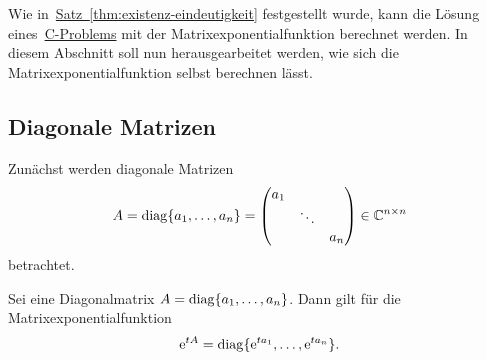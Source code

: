 Wie in~\hyperref[thm:existenz-eindeutigkeit]{Satz~\ref*{thm:existenz-eindeutigkeit}} festgestellt wurde,
kann die Lösung eines~\hyperref[eq:cp]{C-Problems} mit der Matrixexponentialfunktion berechnet werden.
In diesem Abschnitt soll nun herausgearbeitet werden, wie sich die Matrixexponentialfunktion selbst berechnen lässt.

\subsection{Diagonale Matrizen}\label{subsec:diagonale-matrizen}
Zunächst werden diagonale Matrizen
\begin{equation*}
    A = \operatorname{diag}\{a_1,\dots,a_n\}
    = \begin{pmatrix}
          a_1 &        & \\
              & \ddots & \\
              &        & a_n
    \end{pmatrix} \in \mathbb{C}^{n \times n}
\end{equation*}
betrachtet.

\begin{theorem}\label{thm:matrixexponential-diagonal}
    Sei eine Diagonalmatrix $A = \operatorname{diag}\{a_1,\dots,a_n\}$.
    Dann gilt für die Matrixexponentialfunktion
    \begin{equation*}
        \mathrm{e}^{t A} = \operatorname{diag}\{\mathrm{e}^{t a_1},\dots,\mathrm{e}^{t a_n}\}.
    \end{equation*}
\end{theorem}

